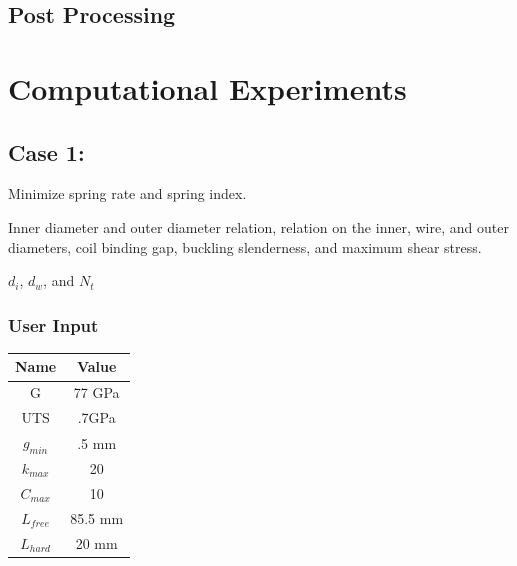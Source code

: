 \documentclass[10pt]{article}
\begin{document}
\subsection{Post Processing}
\label{subsec:Post_Processing}


\section{Computational Experiments}
\label{sec:Computational_Experiments}

\subsection{Case 1:}
\label{subsec:Case1}

\begin{description}[leftmargin=!,labelwidth=\widthof{\bfseries State Variables:}, labelindent = 1cm]
 	\item [Objectives:] Minimize spring rate and spring index.\\

	\item[Constraints:] Inner diameter and outer diameter relation, relation on the inner, wire, and outer diameters, coil binding gap, buckling slenderness, and maximum shear stress. \\
	\item[State Variables:] $d_{i}$, $d_{w}$, and $N_{t}$ \\
\end{description}

	\subsubsection{User Input}
	
\begin{center}
	 \begin{tabular}{| c  | c |  }
	 	\hline Name & Value\\
	 	\hline G & 77 GPa \\
		\hline UTS & .7GPa \\
		\hline $g_{min}$ & .5 mm\\ 
	 	\hline $k_{max}$ & 20\\
		\hline $C_{max}$ & 10\\
		\hline $L_{free}$ & 85.5 mm\\
		\hline $L_{hard}$ & 20 mm\\
		\hline
	 \end{tabular}
\end{center}
\end{document}
